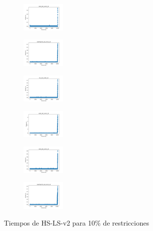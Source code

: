 \begin{figure}[H]
\begin{subfigure}
        \centering
        \includegraphics[width=0.234\textwidth]{img/HS-LS-v2/rand_set_const_10_49258669_time.png}
    \end{subfigure}
    \hfill
    \begin{subfigure}
        \centering
        \includegraphics[width=0.234\textwidth]{img/HS-LS-v2/newthyroid_set_const_10_49258669_time.png}
    \end{subfigure}
    \hfill
    \begin{subfigure}
        \centering
        \includegraphics[width=0.234\textwidth]{img/HS-LS-v2/iris_set_const_10_3773969821_time.png}
    \end{subfigure}
    \hfill
    \begin{subfigure}
        \centering
        \includegraphics[width=0.234\textwidth]{img/HS-LS-v2/ecoli_set_const_10_3773969821_time.png}
    \end{subfigure}
    \hfill
    \begin{subfigure}
        \centering
        \includegraphics[width=0.234\textwidth]{img/HS-LS-v2/rand_set_const_10_3773969821_time.png}
    \end{subfigure}
    \hfill
    \begin{subfigure}
        \centering
        \includegraphics[width=0.234\textwidth]{img/HS-LS-v2/newthyroid_set_const_10_3773969821_time.png}
    \end{subfigure}
    \caption{Tiempos de HS-LS-v2 para 10\% de restricciones}
\end{figure}

